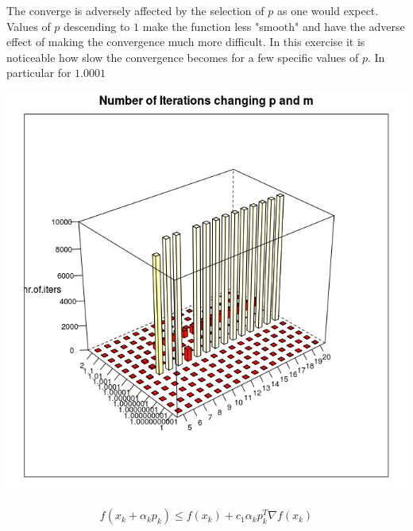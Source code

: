 The converge is adversely affected by the selection of $p$ as one would expect. Values of $p$ descending to $1$ make the function less "smooth" and have the adverse effect of making the convergence much more difficult. In this exercise it is noticeable how slow the convergence becomes for a few specific values of $p$. In particular for $1.0001$

\begin{center}
\includegraphics[scale=0.3]{Figures/hist3dmpniter.png}
\end{center}

\begin{equation}
  \begin{aligned}
    f(x_k + \alpha_kp_k) \leq f(x_k) + c_1 \alpha _k p_k^T\nabla f(x_k)
  \end{aligned}
\end{equation}

